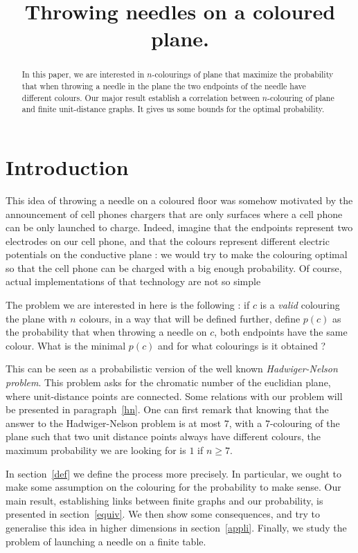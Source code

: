 \documentclass[a4paper,11pt]{article}
\title{Throwing needles on a coloured plane.}
\theoremstyle{definition}
\theoremstyle{remark}
\begin{document}
\maketitle

\begin{abstract}  In this paper, we are interested in $n$-colourings of plane 
that maximize the probability that when throwing a needle in the plane the two 
endpoints of the needle have different colours. Our major result establish a 
correlation between $n$-colouring of plane and finite unit-distance graphs. 
It gives us some bounds for the optimal probability.\end{abstract}

\section{Introduction}
This idea of throwing a needle on a coloured floor was somehow motivated by 
the announcement of cell phones chargers that are only surfaces where a cell 
phone can be only launched to charge. Indeed, imagine that the endpoints 
represent two electrodes on our cell phone, and that the colours represent 
different electric potentials on the conductive plane : we would try to make 
the colouring optimal so that the cell phone can be charged with a big enough 
probability. Of course, actual implementations of that technology are not so 
simple

The problem we are interested in here is the following : if $c$ is a 
\emph{valid} colouring the plane with $n$ colours, in a  way that will be 
defined further, define $p(c)$ as the probability that when throwing a needle 
on $c$, both endpoints have the same colour. What is the minimal $p(c)$ and 
for what colourings is it obtained ?

This can be seen as a probabilistic version of the well known 
\emph{Hadwiger-Nelson problem}. This problem asks for the chromatic number 
of the euclidian plane, where unit-distance points are connected. Some 
relations with our problem will be presented in paragraph~\ref{hn}. One can 
first remark that knowing that the answer to the Hadwiger-Nelson problem is at 
most $7$, with a $7$-colouring of the plane such that two unit distance points 
always have different colours, the maximum probability we are looking for is 
$1$ if $n \geq 7$.

In section~\ref{def} we define the process more precisely. In particular, we 
ought to make some assumption on the colouring for the probability to make 
sense. Our main result, establishing links between finite graphs and our 
probability, is presented in section~\ref{equiv}. We then show some 
consequences, and try to generalise this idea in higher dimensions in
section~\ref{appli}. Finally, we study the problem of launching a needle on a finite 
table.
\end{document}
